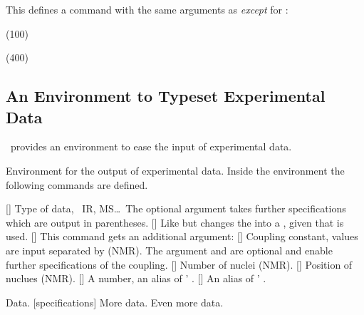 \documentclass[load-preamble+]{cnltx-doc}
\begin{document}
This defines a command with the same arguments as  \emph{except} for
:
\begin{example}
  \NewChemNMR{}%
  \NewChemNMR{}%
  \CNMR*(100) \par
  \HNMR*(400)
\end{example}

\subsection{An Environment to Typeset Experimental Data}

\chemmacros\ provides an environment to ease the input of experimental data.
\begin{environments}
    Environment for the output of experimental data.  Inside the environment
    the following commands are defined.
\end{environments}
\begin{commands}
  []
    Type of data, \eg\ IR, MS\ldots\  The optional argument takes further
    specifications which are output in parentheses.
  [\sarg{}]
    Like  but changes the \code{=} into a \code{:}, given that
     is used.
  []
    This command gets an additional argument:
     
  []
    Coupling constant, values are input separated by \code{;} (NMR).  The
    argument  and  are optional
    and enable further specifications of the coupling.
  \command{\#}[]
    Number of nuclei (NMR).
  []
    Position of nuclues (NMR).
  []
    A number, an alias of ' .
  []
    An alias of ' .
\end{commands}

\begin{example}
  \begin{experimental}
     Data.
    [specifications] More data.
     Even more data.
  \end{experimental}
\end{example}
\end{document}
